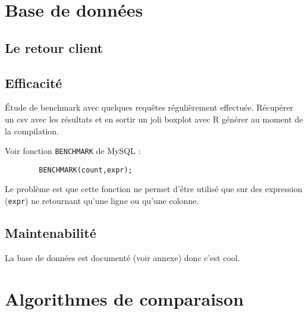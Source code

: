 
\section{Base de données}

	\subsection{Le retour client}



	\subsection{Efficacité}

Étude de benchmark avec quelques requêtes régulièrement effectuée. Récupérer un csv avec les résultats et en sortir un joli boxplot avec R générer au moment de la compilation.

Voir fonction \texttt{BENCHMARK} de MySQL :
	\begin{verbatim}
		BENCHMARK(count,expr);
	\end{verbatim}
Le problème est que cette fonction ne permet d'être utilisé que sur des expression (\texttt{expr}) ne retournant qu'une ligne ou qu'une colonne.

	\subsection{Maintenabilité}

La base de données est documenté (voir annexe) donc c'est cool.


\section{Algorithmes de comparaison}

